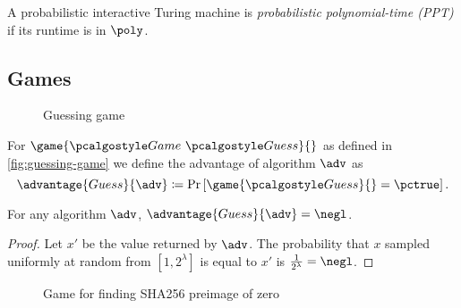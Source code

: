 A probabilistic interactive Turing machine is \emph{probabilistic polynomial-time (PPT)} if its runtime is in $\poly$.


\subsection{Games}

\begin{figure}[tbhp]
  \begin{center}
    \begin{tcolorbox}[width=3cm]
      \begin{pchstack}[center]
      \end{pchstack}
    \end{tcolorbox}
  \end{center}
  \caption{Guessing game\label{fig:guessing-game}}
\end{figure}

\begin{definition}
  For $\game{\Game~\algo{Guess}}{}$ as defined in \autoref{fig:guessing-game} we define the advantage of algorithm $\adv$ as
 \[
  \advantage{Guess}{\adv} \defeq \pr{\game{\algo{Guess}}{} = \pctrue}.
 \]
\end{definition}

\begin{proposition}
  For any algorithm $\adv$, $\advantage{Guess}{\adv} = \negl$.
\end{proposition}

\begin{proof}
Let $x'$ be the value returned by $\adv$.
The probability that $x$ sampled uniformly at random from $[1, 2^\lambda]$ is equal to $x'$ is $\frac{1}{2^\lambda} = \negl$.
\end{proof}


\begin{figure}[tbhp]
  \begin{center}
    \begin{tcolorbox}[width=5cm]
      \begin{pchstack}[center]
      \end{pchstack}
    \end{tcolorbox}
  \end{center}
  \caption{Game for finding SHA256 preimage of zero \label{fig:sha-preimg-0}}
\end{figure}

